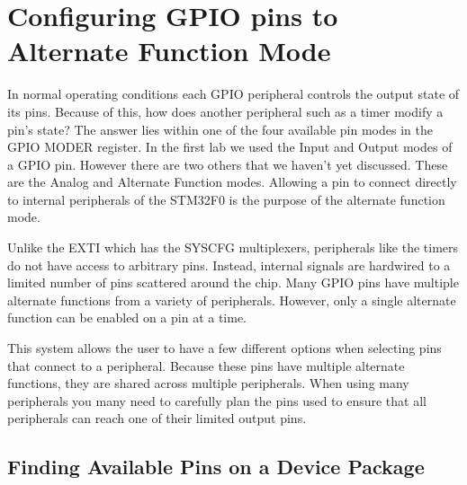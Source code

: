 \documentclass[11pt,fleqn]{book} %
\begin{document}
\section{Configuring GPIO pins to Alternate Function Mode} \label{alternate_mode}

In normal operating conditions each GPIO peripheral controls the output state of its pins. Because of this, how does another peripheral such as a timer modify a pin's state? The answer lies within one of the four available pin modes in the GPIO MODER register. In the first lab we used the Input and Output modes of a GPIO pin. However there are two others that we haven't yet discussed. These are the Analog and Alternate Function modes. Allowing a pin to connect directly to internal peripherals of the STM32F0 is the purpose of the alternate function mode. 

Unlike the EXTI which has the SYSCFG multiplexers, peripherals like the timers do not have access to arbitrary pins. Instead, internal signals are hardwired to a limited number of pins scattered around the chip. Many GPIO pins have multiple alternate functions from a variety of peripherals. However, only a single alternate function can be enabled on a pin at a time.

This system allows the user to have a few different options when selecting pins that connect to a peripheral. Because these pins have multiple alternate functions, they are shared across multiple peripherals. When using many peripherals you many need to carefully plan the pins used to ensure that all peripherals can reach one of their limited output pins.  

%    
    
    \subsection{Finding Available Pins on a Device Package}
    
\end{document}

